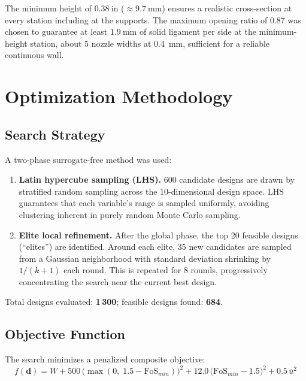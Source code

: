 \documentclass[11pt,letterpaper]{article}
\begin{document}
The minimum height of $0.38\ \mathrm{in}$ ($\approx 9.7\ \mathrm{mm}$) ensures
a realistic cross-section at every station including at the supports.  The
maximum opening ratio of 0.87 was chosen to guarantee at least $1.9\ \mathrm{mm}$
of solid ligament per side at the minimum-height station, about 5 nozzle
widths at 0.4~mm, sufficient for a reliable continuous wall.


\section{Optimization Methodology}
\label{sec:optimization}

\subsection{Search Strategy}

A two-phase surrogate-free method was used:

\begin{enumerate}
  \item \textbf{Latin hypercube sampling (LHS).}
    600 candidate designs are drawn by stratified random sampling across the
    10-dimensional design space.  LHS guarantees that each variable's range
    is sampled uniformly, avoiding clustering inherent in purely random
    Monte Carlo sampling.

  \item \textbf{Elite local refinement.}
    After the global phase, the top 20 feasible designs (``elites'') are
    identified.  Around each elite, 35 new candidates are sampled from a
    Gaussian neighborhood with standard deviation shrinking by $1/(k+1)$
    each round.  This is repeated for 8 rounds, progressively concentrating
    the search near the current best design.
\end{enumerate}

Total designs evaluated: \textbf{1\,300}; feasible designs found: \textbf{684}.

\subsection{Objective Function}

The search minimizes a penalized composite objective:
\[
  f(\mathbf{d}) = W
  + 500\,\bigl(\max(0,\;1.5 - \mathrm{FoS}_{min})\bigr)^2
  + 12.0\,\bigl(\mathrm{FoS}_{min} - 1.5\bigr)^2
  + 0.5\,\overline{u}^2
\]
\end{document}
